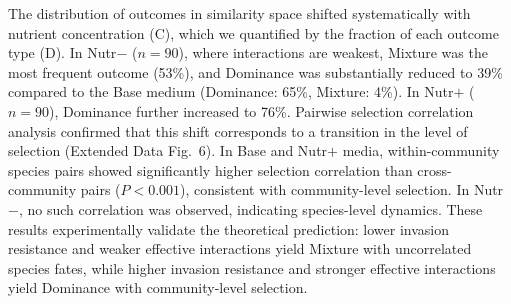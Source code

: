  The distribution of outcomes in similarity space shifted systematically with nutrient concentration (C), which we quantified by the fraction of each outcome type (D). In Nutr$-$ ($n = 90$), where interactions are weakest, Mixture was the most frequent outcome (53\%), and Dominance was substantially reduced to 39\% compared to the Base medium (Dominance: 65\%, Mixture: 4\%). In Nutr$+$ ($n = 90$), Dominance further increased to 76\%.  Pairwise selection correlation analysis confirmed that this shift corresponds to a transition in the level of selection (Extended Data Fig.~6). In Base and Nutr$+$ media, within-community species pairs showed significantly higher selection correlation than cross-community pairs ($P < 0.001$), consistent with community-level selection. In Nutr$-$, no such correlation was observed, indicating species-level dynamics.  These results experimentally validate the theoretical prediction: lower invasion resistance and weaker effective interactions yield Mixture with uncorrelated species fates, while higher invasion resistance and stronger effective interactions yield Dominance with community-level selection.

